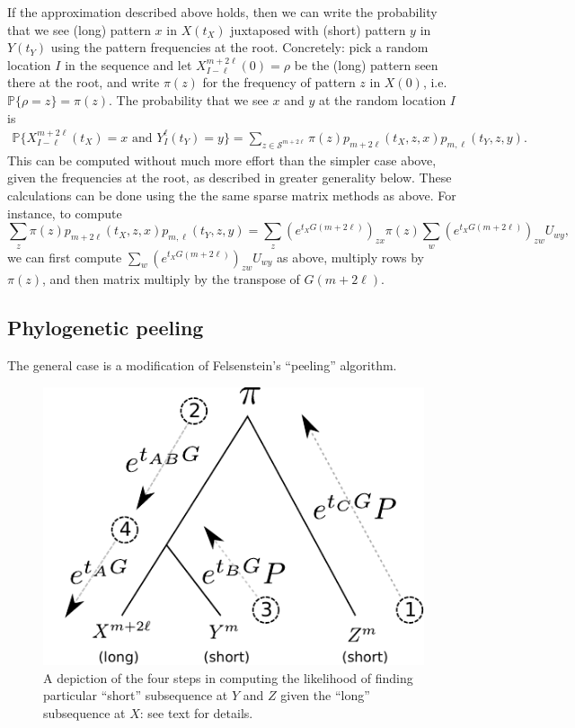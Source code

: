 \documentclass{article}
\renewcommand{\P}{\mathbb{P}}
\newcommand{\calS}{\mathcal{S}}  %
\theoremstyle{plain}
\theoremstyle{definition}
\begin{document}
If the approximation described above holds,
then we can write the probability that we see (long) pattern $x$ in $X(t_X)$ juxtaposed with (short) pattern $y$ in $Y(t_Y)$
using the pattern frequencies at the root.
Concretely: pick a random location $I$ in the sequence and let $X_{I-\ell}^{m+2\ell}(0) = \rho$ be the (long) pattern seen there at the root,
and write $\pi(z)$ for the frequency of pattern $z$ in $X(0)$, i.e.\ $\P\{\rho=z\}=\pi(z)$.
The probability that we see $x$ and $y$ at the random location $I$ is
\begin{align} \label{eqn:phylo_likelihood}
    \P\{X_{I-\ell}^{m+2\ell}(t_X)=x \text{ and } Y_I^\ell(t_Y)=y \} = \sum_{z \in \calS^{m+2\ell}} \pi(z) p_{m+2\ell}(t_X,z,x) p_{m,\ell}(t_Y,z,y) .
\end{align}
This can be computed without much more effort than the simpler case above,
given the frequencies at the root, as described in greater generality below.
These calculations can be done using the the same sparse matrix methods as above.
For instance, to compute
\[
    \sum_z \pi(z) p_{m+2\ell}(t_X,z,x) p_{m,\ell}(t_Y,z,y)
    = \sum_z \left( e^{t_X G(m+2\ell)} \right)_{zx} \pi(z) \sum_w \left( e^{t_X G(m+2\ell)} \right)_{zw} U_{wy} ,
\]
we can first compute $\sum_w \left( e^{t_X G(m+2\ell)} \right)_{zw} U_{wy}$ as above,
multiply rows by $\pi(z)$, and then matrix multiply by the transpose of $G(m+2\ell)$.


\subsection{Phylogenetic peeling}

The general case is a modification of Felsenstein's ``peeling'' algorithm.

\begin{figure}
    \begin{center}
    \includegraphics{peeling-schematic}
    \end{center}
    \caption{
        A depiction of the four steps in computing the likelihood of finding particular ``short'' subsequence at $Y$ and $Z$
        given the ``long'' subsequence at $X$: see text for details.
        \label{fig:peeling}
    }
\end{figure}
\end{document}
